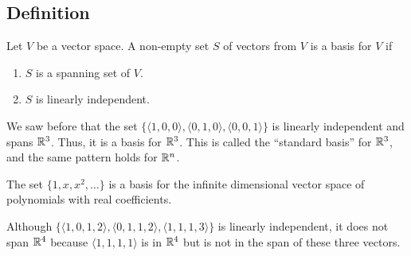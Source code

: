 \subsection{Definition}
\begin{definition}
	Let $V$ be a vector space.
	A non-empty set $S$ of vectors from $V$ is a basis for $V$ if
	\begin{enumerate}
		\item $S$ is a spanning set of $V$.
		\item $S$ is linearly independent.
	\end{enumerate}
\end{definition}

\begin{example}
	We saw before that the set $\{\langle 1, 0, 0 \rangle, \langle 0, 1, 0 \rangle, \langle 0, 0, 1 \rangle\}$ is linearly independent and spans $\mathbb{R}^3$.
	Thus, it is a basis for $\mathbb{R}^3$.
	This is called the ``standard basis'' for $\mathbb{R}^3$, and the same pattern holds for $\mathbb{R}^n$.
\end{example}
\begin{example}
	The set $\{1, x, x^2, \dots\}$ is a basis for the infinite dimensional vector space of polynomials with real coefficients.
\end{example}
\begin{example}
	Although $\{\langle 1, 0, 1, 2 \rangle, \langle 0, 1, 1, 2 \rangle, \langle 1, 1, 1, 3 \rangle \}$ is linearly independent, it does not span $\mathbb{R}^4$ because $\langle 1, 1, 1, 1 \rangle$ is in $\mathbb{R}^4$ but is not in the span of these three vectors.
\end{example}